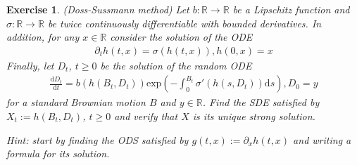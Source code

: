 \documentclass[12pt]{article}
\theoremstyle{colon}
\newtheorem{exercise}{Exercise}
\begin{document}
\begin{exercise}
  (Doss-Sussmann method) Let $b : \mathbb{R} \rightarrow \mathbb{R}$ be a Lipschitz function and $\sigma : \mathbb{R} \rightarrow \mathbb{R}$ be twice continuously differentiable with bounded derivatives. In addition, for any $x \in \mathbb{R}$ consider the solution of the ODE
  \begin{gather*}
    \partial_t h(t,x) = \sigma(h(t,x)), h(0,x) = x
  \end{gather*}
  Finally, let $D_t$, $t \geq 0$ be the solution of the random ODE
  \begin{gather*}
    \frac{\text{d} D_t}{\text{d}t} = b(h(B_t, D_t)) \text{exp} \left( - \int_0^{B_t} \sigma'(h(s, D_t)) \text{d} s \right), D_0 = y
  \end{gather*}
  for a standard Brownian motion $B$ and $y \in \mathbb{R}$. Find the SDE satisfied by $X_t := h(B_t, D_t)$, $t \geq 0$ and verify that $X$ is its unique strong solution.

  \textit{Hint: start by finding the ODS satisfied by $g(t,x) := \partial_x h(t,x)$ and writing a formula for its solution.}
\end{exercise}
\end{document}

